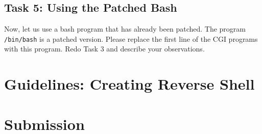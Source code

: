 \subsection{Task 5: Using the Patched Bash}

Now, let us use a bash program that has already been patched.
The program \texttt{/bin/bash} is a patched version.
Please replace the first line of 
the CGI programs with this program. 
Redo Task 3 and describe your observations. 


\section{Guidelines: Creating Reverse Shell}
\label{shellshock:sec:reverseshell}








\section{Submission}






